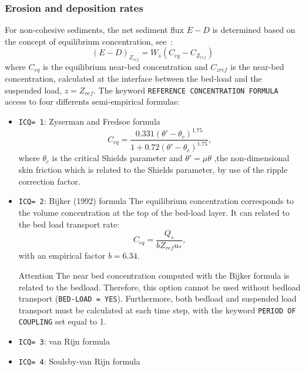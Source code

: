 \subsubsection{Erosion and deposition rates}
For non-cohesive sediments, the net sediment flux $E-D$ is
determined based on the concept of equilibrium concentration, see~\cite{CelikRodi}:
\begin{equation}\label{eq:CelikRodi}
\left(E-D \right)_{Z_{ref}} = W_s \left(C_{eq} - C_{Z_{ref}}\right) 
\end{equation}
where $C_{eq}$ is the equilibrium near-bed concentration and $C_{zref}$ is
the near-bed concentration, calculated at the interface between the bed-load
and the suspended load, $z=Z_{ref}$. The keyword \texttt{REFERENCE CONCENTRATION FORMULA} access to four differents semi-empirical formulas: 
\begin{itemize}
\item \texttt{ICQ= 1}: Zyserman and Fredsoe formula
\begin{equation}\label{eq:ZysermanFredsoe}
C_{eq} =\frac{0.331(\theta'-\theta_c)^{1.75}}{1+0.72(\theta'-\theta_c)^{1.75}}, 
\end{equation}
where $\theta_c$ is the critical Shields parameter and $\theta'= \mu\theta$ ,the non-dimensional skin friction which is related to the Shields parameter, by use of the ripple correction factor.

\item \texttt{ICQ= 2}: Bijker (1992) formula
The equilibrium concentration corresponds to the volume concentration at the
top of the bed-load layer. It can related to the bed load transport rate:
\begin{equation}\label{eq:Bijker}
C_{eq} = \frac{Q_s}{b Z_{ref} u_*}, 
\end{equation}
with an empirical factor $b = 6.34$.

\begin{bclogo}[couleur = blue!10, arrondi = 0.10, logo = \bcattention]{\textsf{Attention}}
The near bed concentration computed with the Bijker formula is related to the bedload. Therefore, this option cannot be used without bedload transport (\texttt{BED-LOAD = YES}). Furthermore, both bedload and suspended load transport must be calculated at each time step, with the keyword \texttt{PERIOD OF COUPLING} set equal to 1.
\end{bclogo}

\item \texttt{ICQ= 3}: van Rijn formula

\item \texttt{ICQ= 4}: Soulsby-van Rijn formula
\end{itemize}

